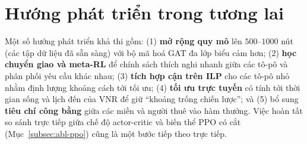 \documentclass[../DoAn.tex]{subfiles}
\begin{document}
\section{Hướng phát triển trong tương lai}  %
\label{sec:huong-phat-trien}

Một số hướng phát triển khả thi gồm: (1) \textbf{mở rộng quy mô} lên $500$–$1000$ nút (các tập dữ liệu đã sẵn sàng) với bộ mã hoá GAT đa lớp biểu cảm hơn; (2) \textbf{học chuyển giao và meta-RL} để chính sách thích nghi nhanh giữa các tô-pô và phân phối yêu cầu khác nhau; (3) \textbf{tích hợp cận trên ILP} cho các tô-pô nhỏ nhằm định lượng khoảng cách tới tối ưu; (4) \textbf{tối ưu trực tuyến} có tính tới thời gian sống và lịch đến của VNR để giữ ``khoảng trống chiến lược''; và (5) bổ sung \textbf{tiêu chí công bằng} giữa các miền và người thuê vào hàm thưởng. Việc hoàn tất so sánh trực tiếp giữa chế độ actor-critic và biến thể PPO có cắt (Mục~\ref{subsec:abl-ppo}) cũng là một bước tiếp theo trực tiếp.
\end{document}
